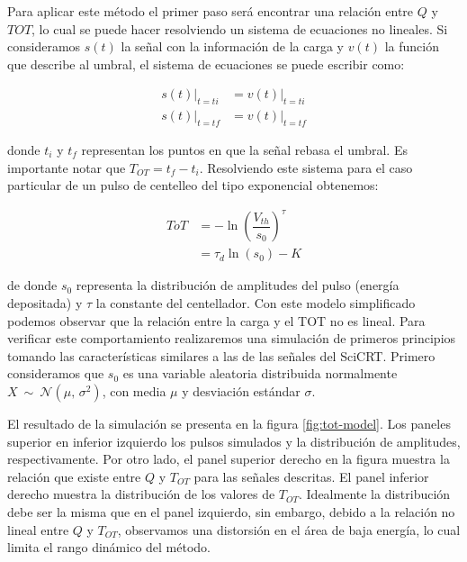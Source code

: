Para aplicar este método el primer paso será encontrar una relación entre $Q$ y $TOT$, lo cual se puede hacer resolviendo un sistema de ecuaciones no lineales. Si consideramos $s\left(t\right)$ la señal con la información de la carga y $v\left(t\right)$ la función que describe al umbral, el sistema de ecuaciones se puede escribir como:

\begin{equation}
\label{equ:tot-equ}
\begin{aligned}
\left. s\left(t\right)\right|_{t=ti} &= \left. v\left(t\right)\right|_{t=ti}\\
\left. s\left(t\right)\right|_{t=tf} &= \left. v\left(t\right)\right|_{t=tf}
\end{aligned}
\end{equation}

donde $t_{i}$ y $t_{f}$ representan los puntos en que la señal rebasa el umbral. Es importante notar que $T_{OT}=t_{f}-t_{i}$. Resolviendo este sistema para el caso particular de un pulso de centelleo del tipo exponencial obtenemos:

\begin{equation}
\begin{aligned}
ToT &= -\ln\left(\dfrac{V_{th}}{s_{0}}\right)^{\tau}\\
 &= \tau_{d} \ln\left(s_{0}\right)-K
\end{aligned}
\end{equation}

de donde $s_{0}$ representa la distribución de amplitudes del pulso (energía depositada) y $\tau$ la constante del centellador. Con este modelo simplificado podemos observar que la relación entre la carga y el TOT no es lineal. Para verificar este comportamiento realizaremos una simulación de primeros principios tomando las características similares a las de las señales del SciCRT. Primero consideramos que $s_{0}$ es una variable aleatoria distribuida normalmente $X\ \sim\ \mathcal{N}\left(\mu,\,\sigma^2\right)$, con media $\mu$ y desviación estándar $\sigma$.

El resultado de la simulación se presenta en la figura \ref{fig:tot-model}. Los paneles superior en inferior izquierdo los pulsos simulados y la distribución de amplitudes, respectivamente. Por otro lado, el panel superior derecho en la figura muestra la relación que existe entre $Q$ y $T_{OT}$ para las señales descritas. El panel inferior derecho muestra la distribución de los valores de $T_{OT}$. Idealmente la distribución debe ser la misma que en el panel izquierdo, sin embargo, debido a la relación no lineal entre $Q$ y $T_{OT}$, observamos una distorsión en el área de baja energía, lo cual limita el rango dinámico del método.

